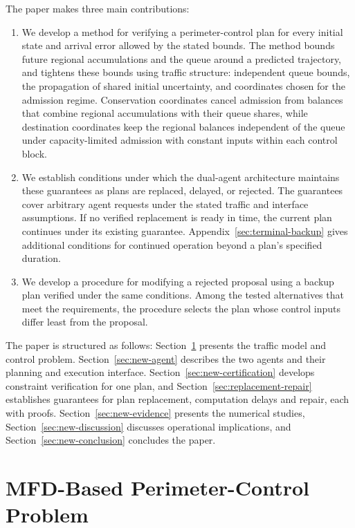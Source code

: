 \documentclass[final]{cas-sc}
\theoremstyle{definition}
\theoremstyle{plain}
\theoremstyle{definition}
\theoremstyle{plain}
\newcommand{\appref}[1]{Appendix~\ref{#1}}
\begin{document}
The paper makes three main contributions:
\begin{enumerate}
\item We develop a method for verifying a perimeter-control plan for
every initial state and arrival error allowed by the stated bounds. The
method bounds future regional accumulations and the queue around a
predicted trajectory, and tightens these bounds using traffic
structure: independent queue bounds, the propagation of shared initial
uncertainty, and coordinates chosen for the admission regime.
Conservation coordinates cancel admission from balances that combine
regional accumulations with their queue shares, while destination
coordinates keep the regional balances independent of the queue under
capacity-limited admission with constant inputs within each control block.

\item We establish conditions under which the dual-agent architecture
maintains these guarantees as plans are replaced, delayed, or rejected.
The guarantees cover arbitrary agent requests under the stated traffic
and interface assumptions. If no verified replacement is ready in time,
the current plan continues under its existing guarantee.
\appref{sec:terminal-backup} gives additional conditions for continued
operation beyond a plan's specified duration.

\item We develop a procedure for modifying a rejected proposal using a
backup plan verified under the same conditions. Among the tested
alternatives that meet the requirements, the procedure selects the plan
whose control inputs differ least from the proposal.
\end{enumerate}

The paper is structured as follows:
Section~\ref{sec:new-problem} presents the traffic model and control
problem. Section~\ref{sec:new-agent} describes the two agents and their
planning and execution interface. Section~\ref{sec:new-certification} develops
constraint verification for one plan, and Section~\ref{sec:replacement-repair}
establishes guarantees for plan replacement, computation delays and repair,
each with proofs.
Section~\ref{sec:new-evidence} presents the numerical studies,
Section~\ref{sec:new-discussion} discusses operational implications, and
Section~\ref{sec:new-conclusion} concludes the paper.

\section{MFD-Based Perimeter-Control Problem}
\label{sec:new-problem}
\end{document}
